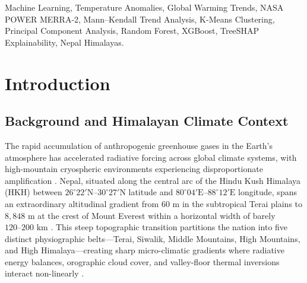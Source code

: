 \documentclass[conference]{IEEEtran}
\begin{document}
\begin{abstract}
API persistence baseline ($\text{RMSE} = 0.9343^\circ\text{C}$). Finally, coupling the calibrated framework with Intergovernmental Panel on Climate Change (IPCC) Shared Socioeconomic Pathways projects Himalayan mean temperature anomalies of $+1.35^\circ\text{C}$ ($9.55^\circ\text{C}$, SSP1-2.6), $+1.76^\circ\text{C}$ ($9.96^\circ\text{C}$, SSP2-4.5), and $+2.38^\circ\text{C}$ ($10.58^\circ\text{C}$, SSP5-8.5) by 2050.
\end{abstract}

\begin{IEEEkeywords}
Machine Learning, Temperature Anomalies, Global Warming Trends, NASA POWER MERRA-2, Mann--Kendall Trend Analysis, K-Means Clustering, Principal Component Analysis, Random Forest, XGBoost, TreeSHAP Explainability, Nepal Himalayas.
\end{IEEEkeywords}

\section{Introduction}

\subsection{Background and Himalayan Climate Context}
The rapid accumulation of anthropogenic greenhouse gases in the Earth's atmosphere has accelerated radiative forcing across global climate systems, with high-mountain cryospheric environments experiencing disproportionate amplification \cite{ipcc2018, shrestha2015}. Nepal, situated along the central arc of the Hindu Kush Himalaya (HKH) between $26^\circ 22'\text{N}\text{--}30^\circ 27'\text{N}$ latitude and $80^\circ 04'\text{E}\text{--}88^\circ 12'\text{E}$ longitude, spans an extraordinary altitudinal gradient from $60\text{ m}$ in the subtropical Terai plains to $8,848\text{ m}$ at the crest of Mount Everest within a horizontal width of barely $120\text{--}200\text{ km}$ \cite{sapkota2007, bhattarai2022}. This steep topographic transition partitions the nation into five distinct physiographic belts---Terai, Siwalik, Middle Mountains, High Mountains, and High Himalaya---creating sharp micro-climatic gradients where radiative energy balances, orographic cloud cover, and valley-floor thermal inversions interact non-linearly \cite{sapkota2007, karmacharya2021}.
\end{document}
